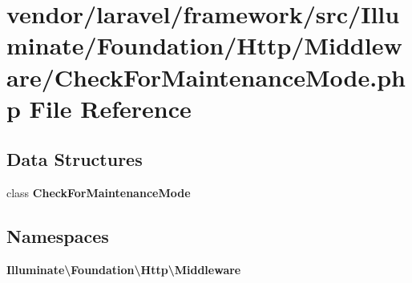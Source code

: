 \section{vendor/laravel/framework/src/\+Illuminate/\+Foundation/\+Http/\+Middleware/\+Check\+For\+Maintenance\+Mode.php File Reference}
\label{_check_for_maintenance_mode_8php}
\subsection*{Data Structures}
\begin{DoxyCompactItemize}
\item 
class {\bf Check\+For\+Maintenance\+Mode}
\end{DoxyCompactItemize}
\subsection*{Namespaces}
\begin{DoxyCompactItemize}
\item 
 {\bf Illuminate\textbackslash{}\+Foundation\textbackslash{}\+Http\textbackslash{}\+Middleware}
\end{DoxyCompactItemize}
